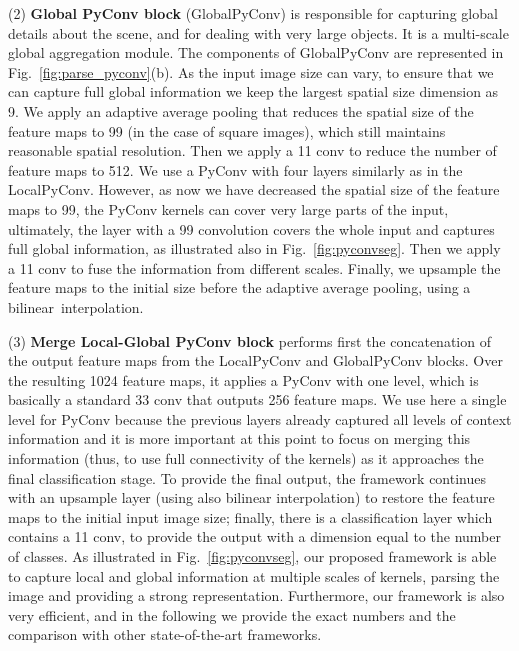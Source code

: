 \documentclass{article}
\begin{document}
(2) {\bf Global PyConv block} (GlobalPyConv) is responsible for capturing global details about the scene, and for dealing with very large objects. It is a multi-scale global aggregation module. The components of GlobalPyConv are represented in Fig.~\ref{fig:parse_pyconv}(b). As the input image size can vary, to ensure that we can capture full global information we keep the largest spatial size dimension as 9.
We apply an adaptive average pooling that reduces the spatial size of the feature maps to 99 (in the case of square images), which  still maintains reasonable spatial resolution. Then we apply a 11 conv to reduce the number of feature maps to 512. We use a PyConv with four layers similarly as in the LocalPyConv. However, as now we have decreased the spatial size of the feature maps to 99, the PyConv kernels can cover very large parts of the input, ultimately, the  layer with a 99 convolution covers the whole input and captures full global information, as illustrated also in Fig.~\ref{fig:pyconvseg}. Then we apply a 11 conv to fuse the information from different scales. Finally, we upsample the feature maps to the initial size before the adaptive average pooling, using a  bilinear~interpolation.

(3) {\bf Merge Local-Global PyConv block} performs first the concatenation of the output feature maps from the LocalPyConv and GlobalPyConv blocks. Over the resulting 1024 feature maps, it applies a PyConv with one level, which is basically a standard 33 conv that outputs 256 feature maps. We use here a single level for PyConv because the previous layers already captured all levels of context information and it is more important at this point to focus on merging this information (thus, to use full connectivity of the kernels) as it approaches the final classification stage. To provide the final output, the framework continues with an upsample layer (using also bilinear interpolation) to restore the feature maps to the initial input image size; finally, there is a classification layer which contains a 11 conv, to provide the output with a dimension equal to the number of classes. As illustrated  in Fig.~\ref{fig:pyconvseg}, our proposed framework is able to capture local and global information at multiple scales of kernels, parsing the image and providing a strong representation. Furthermore, our framework is also very efficient, and in the following we provide the exact numbers and the comparison with other state-of-the-art frameworks.
\end{document}
